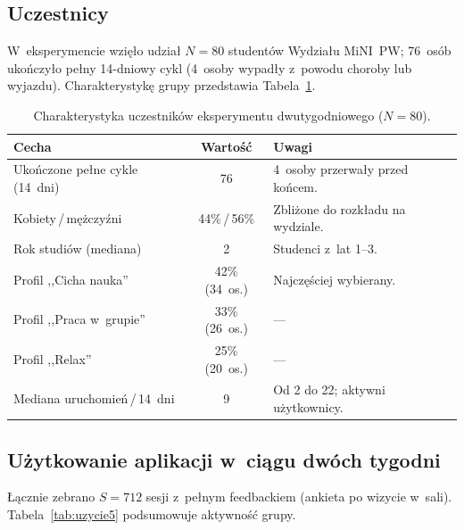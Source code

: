 \documentclass[14pt,a4paper]{extarticle}
\begin{document}
\subsection{Uczestnicy}

W~eksperymencie wzięło udział $N = 80$ studentów Wydziału MiNI~PW; 76~osób ukończyło pełny 14-dniowy cykl (4~osoby wypadły z~powodu choroby lub wyjazdu). Charakterystykę grupy przedstawia Tabela~\ref{tab:uczestnicy5}.

\begin{table}[H]
    \centering
    \caption{Charakterystyka uczestników eksperymentu dwutygodniowego ($N = 80$).}
    \label{tab:uczestnicy5}
    \begin{tabular}{|l|c|p{6.5cm}|}
        \hline
        \textbf{Cecha} & \textbf{Wartość} & \textbf{Uwagi} \\
        \hline
        Ukończone pełne cykle (14~dni) & 76 & 4~osoby przerwały przed końcem. \\
        \hline
        Kobiety\,/\,mężczyźni & 44\%\,/\,56\% & Zbliżone do rozkładu na wydziale. \\
        \hline
        Rok studiów (mediana) & 2 & Studenci z~lat 1--3. \\
        \hline
        Profil ,,Cicha nauka'' & 42\% (34~os.) & Najczęściej wybierany. \\
        \hline
        Profil ,,Praca w~grupie'' & 33\% (26~os.) & --- \\
        \hline
        Profil ,,Relax'' & 25\% (20~os.) & --- \\
        \hline
        Mediana uruchomień\,/\,14~dni & 9 & Od 2 do 22; aktywni użytkownicy. \\
        \hline
    \end{tabular}
\end{table}

\subsection{Użytkowanie aplikacji w~ciągu dwóch tygodni}

Łącznie zebrano $S = 712$ sesji z~pełnym feedbackiem (ankieta po wizycie w~sali). Tabela~\ref{tab:uzycie5} podsumowuje aktywność grupy.
\end{document}
